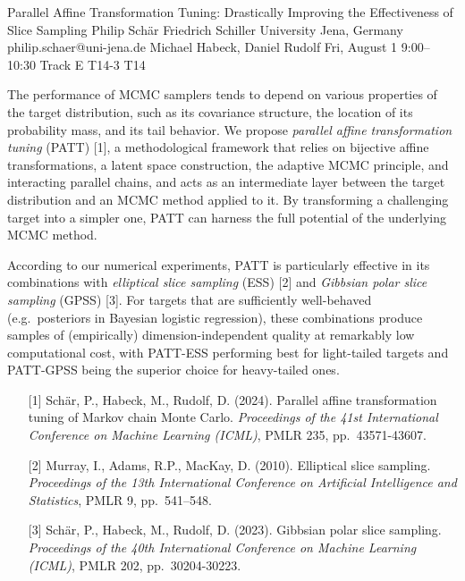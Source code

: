 \begin{talk}
\end{talk}

\begin{talk}
  {Parallel Affine Transformation Tuning: Drastically Improving the Effectiveness of Slice Sampling}%
  {Philip Schär}%
  {Friedrich Schiller University Jena, Germany}%
  {philip.schaer@uni-jena.de}%
  {Michael Habeck, Daniel Rudolf}%
  {}%
  {Fri, August 1 9:00–10:30 Track E}%
  {T14-3}%
  {T14}%
  

The performance of MCMC samplers tends to depend on various properties of the target distribution, such as its covariance structure, the location of its probability mass, and its tail behavior. We propose \textit{parallel affine transformation tuning} (PATT) [1], a methodological framework that relies on bijective affine transformations, a latent space construction, the adaptive MCMC principle, and interacting parallel chains, and acts as an intermediate layer between the target distribution and an MCMC method applied to it. By transforming a challenging target into a simpler one, PATT can harness the full potential of the underlying MCMC method.

According to our numerical experiments, PATT is particularly effective in its combinations with \textit{elliptical slice sampling} (ESS) [2] and \textit{Gibbsian polar slice sampling} (GPSS) [3]. For targets that are sufficiently well-behaved (e.g.~posteriors in Bayesian logistic regression), these combinations produce samples of (empirically) dimension-independent quality at remarkably low computational cost, with PATT-ESS performing best for light-tailed targets and PATT-GPSS being the superior choice for heavy-tailed ones.

\medskip

\begin{enumerate}
	\item[{[1]}] Schär, P., Habeck, M., Rudolf, D. (2024). Parallel affine transformation tuning of Markov chain Monte Carlo. \textit{Proceedings of the 41st International Conference on Machine Learning (ICML)}, PMLR 235, pp.~43571-43607.
	\item[{[2]}] Murray, I., Adams, R.P., MacKay, D. (2010). Elliptical slice sampling. \textit{Proceedings of the 13th International Conference on Artificial Intelligence and Statistics}, PMLR 9, pp.~541--548.
	\item[{[3]}] Schär, P., Habeck, M., Rudolf, D. (2023). Gibbsian polar slice sampling. \textit{Proceedings of the 40th International Conference on Machine Learning (ICML)}, PMLR 202, pp.~30204-30223.
\end{enumerate}

\end{talk}

